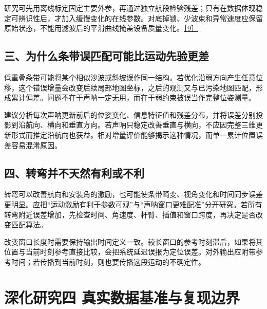 研究可先用离线标定固定主要外参，再通过独立航段检验残差；只有在数据体现稳定可辨识性后，才加入缓慢变化的在线参数。对底掉锁、少波束和异常速度应保留原始状态，不能用滤波后的平滑曲线掩盖设备质量变化。\href{https://arxiv.org/abs/2404.13742}{［9］}

\hypertarget{ux4e09ux4e3aux4ec0ux4e48ux6761ux5e26ux8befux5339ux914dux53efux80fdux6bd4ux8fd0ux52a8ux5148ux9a8cux66f4ux5dee}{%
\subsection{三、为什么条带误匹配可能比运动先验更差}\label{ux4e09ux4e3aux4ec0ux4e48ux6761ux5e26ux8befux5339ux914dux53efux80fdux6bd4ux8fd0ux52a8ux5148ux9a8cux66f4ux5dee}}

低重叠条带可能将某个相似沙波或斜坡误作同一结构。若优化沿弱方向产生任意位移，这个错误增量会改变后续局部地图坐标，之后的观测又与已污染地图匹配，形成累计偏差。问题不在于声呐一定无用，而在于弱约束被误当作完整位姿测量。

建议分析每次声呐更新前后的位姿变化、信息特征值和残差分布，并将误差分别投影到沿航向、横向和垂直方向。若声呐只稳定改善垂直与横向，不应因完整三维更新形式而推定沿航向也获益。相对增量评价能够揭示这种情况，而单一累计位置误差容易混淆原因。

\hypertarget{ux56dbux8f6cux5f2fux5e76ux4e0dux5929ux7136ux6709ux5229ux6216ux4e0dux5229}{%
\subsection{四、转弯并不天然有利或不利}\label{ux56dbux8f6cux5f2fux5e76ux4e0dux5929ux7136ux6709ux5229ux6216ux4e0dux5229}}

转弯可以改善航向和安装角的激励，也可能使条带畸变、视角变化和时间同步误差更明显。应把``运动激励有利于参数可观''与``声呐窗口更难配准''分开研究。若所有转弯附近误差增加，先检查时间、角速度、杆臂、插值和窗口跨度，再决定是否改变匹配算法。

改变窗口长度时需要保持输出时间定义一致。较长窗口的参考时刻滞后，如果将其位置与当前时刻参考直接比较，会把系统延迟误报为定位误差。对外输出应附带参考时间；若传播到当前时刻，则也要传播这段运动的不确定性。

\hypertarget{ux6df1ux5316ux7814ux7a76ux56db-ux771fux5b9eux6570ux636eux57faux51c6ux4e0eux590dux73b0ux8fb9ux754c}{%
\section{深化研究四 真实数据基准与复现边界}\label{ux6df1ux5316ux7814ux7a76ux56db-ux771fux5b9eux6570ux636eux57faux51c6ux4e0eux590dux73b0ux8fb9ux754c}}

